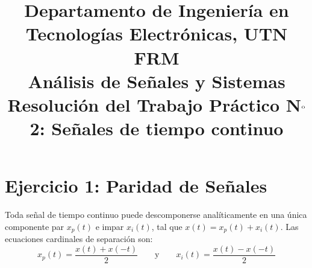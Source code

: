 \documentclass[10pt,a4paper]{article}
\title{%
	{\normalsize Departamento de Ingeniería en Tecnologías Electrónicas, UTN FRM}\\[0.1cm]
	{\large Análisis de Señales y Sistemas}\\[0.15cm]
	{\normalsize Resolución del Trabajo Práctico N$^{\text o}$2: Señales de tiempo continuo}%
}
\author{}
\date{}
\begin{document}
	\maketitle
	\thispagestyle{fancy}
	
	\label{sec:resolucion}

	\section*{Ejercicio 1: Paridad de Señales}
	
	Toda señal de tiempo continuo puede descomponerse analíticamente en una única componente par $x_p(t)$ e impar $x_i(t)$, tal que $x(t) = x_p(t) + x_i(t)$. Las ecuaciones cardinales de separación son:
	\[ x_p(t) = \frac{x(t) + x(-t)}{2} \qquad \text{y} \qquad x_i(t) = \frac{x(t) - x(-t)}{2} \]
\end{document}
